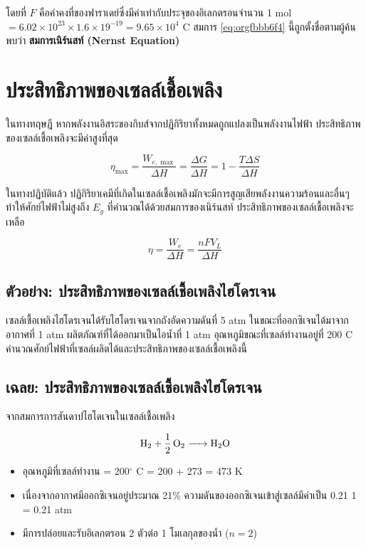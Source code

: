 \documentclass[a4paper,nobib,openany,10pt]{tufte-book}
\begin{document}
โดยที่ \(F\) คือค่าคงที่ของฟาราเดย์ซึ่งมีค่าเท่ากับประจุของอิเลกตรอนจำนวน 1 mol
\(= 6.02 \times 10^{23} \times 1.6 \times 19^{-19} = 9.65 \times 10^4 \text{ C}\)
สมการ \ref{eq:orgfbbb6f4} นี้ถูกตั้งชื่อตามผู้ค้นพบว่า
\textbf{สมการเนิร์นสท์ (Nernst Equation)}

\section{ประสิทธิภาพของเซลล์เชื้อเพลิง}
\label{sec:org1d6cbdd}
ในทางทฤษฎี หากพลังงานอิสระของกิบส์จากปฏิกิริยาทั้งหมดถูกแปลงเป็นพลังงานไฟฟ้า ประสิทธิภาพของเซลล์เชื้อเพลิงจะมีค่าสูงที่สุด

\begin{equation}
\label{eq:fc max eff}
  \eta_{\max} = \frac{W_{e,\max}}{\Delta H} = \frac{\Delta G}{\Delta H} = 1 - \frac{T \Delta S}{\Delta H}
\end{equation}

ในทางปฏิบัติแล้ว ปฏิกิริยาเคมีที่เกิดในเซลล์เชื้อเพลิงมักจะมีการสูญเสียพลังงานความร้อนและอื่นๆ ทำให้ศักย์ไฟฟ้าไม่สูงถึง \(E_g\) ที่คำนวณได้ด้วยสมการของเนิร์นสท์ ประสิทธิภาพของเซลล์เชื้อเพลิงจะเหลือ

\begin{equation}
\label{eq:fc act eff}
  \eta = \frac{W_e}{\Delta H} = \frac{nFV_L}{\Delta H}
\end{equation}

\subsection{ตัวอย่าง: ประสิทธิภาพของเซลล์เชื้อเพลิงไฮโดรเจน}
\label{sec:org046404d}

เซลล์เชื้อเพลิงไฮโดรเจนได้รับไฮโดรเจนจากถังอัดความดันที่ 5 atm
ในขณะที่ออกซิเจนได้มาจากอากาศที่ 1 atm ผลิตภัณฑ์ที่ได้ออกมาเป็นไอน้ำที่
1 atm อุณหภูมิขณะที่เซลล์ทำงานอยู่ที่ 200 C
คำนวณศักย์ไฟฟ้าที่เซลล์ผลิตได้และประสิทธิภาพของเซลล์เชื้อเพลิงนี้

\subsection{เฉลย: ประสิทธิภาพของเซลล์เชื้อเพลิงไฮโดรเจน}
\label{sec:org6cd4a4c}
จากสมการการสันดาปไฮโดเจนในเซลล์เชื้อเพลิง

\[\ce{H2 + 1/2 O2 -> H2O}\]

\begin{itemize}
\item อุณหภูมิที่เซลล์ทำงาน = 200\(^{\circ}\) C = 200 + 273 = 473 K

\item เนื่องจากอากาศมีออกซิเจนอยู่ประมาณ 21\%
ความดันของออกซิเจนเข้าสู่เซลล์มีค่าเป็น 0.21 1 = 0.21 atm

\item มีการปล่อยและรับอิเลกตรอน 2 ตัวต่อ 1 โมเลกุลของน้ำ (\(n = 2\))
\end{itemize}
\end{document}
